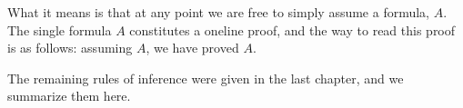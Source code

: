 \documentclass[letterpaper,10pt,english]{sphinxmanual}
\begin{document}
\sphinxAtStartPar
What it means is that at any point we are free to simply assume a formula, \(A\). The single formula \(A\) constitutes a one\sphinxhyphen{}line proof, and the way to read this proof is as follows: assuming \(A\), we have proved \(A\).

\sphinxAtStartPar
The remaining rules of inference were given in the last chapter, and we summarize them here.

\sphinxAtStartPar
{}



\begin{quote}
\AXM{}
\noLine
\UIM{\vdots}
\noLine
{}
\DP
\quad\quad
{}
\DP
\end{quote}

\sphinxAtStartPar
{}



\begin{quote}
\DP
\quad\quad
{}
\DP
\quad\quad
{}
\DP
\end{quote}

\sphinxAtStartPar
{}



\begin{quote}
\AXM{}
\noLine
\UIM{\vdots}
\noLine
\UIM{\bot}
\DP
\quad\quad
{}
\BIM{\bot}
\DP
\end{quote}

\sphinxAtStartPar
{}



\begin{quote}
\DP
\quad\quad
{}
\DP
\quad\quad
{}
\AXM{}
\noLine
\UIM{\vdots}
\noLine
{}
\AXM{}
\noLine
\UIM{\vdots}
\noLine
{}
\DP
\end{quote}

\sphinxAtStartPar
{}
\end{document}

